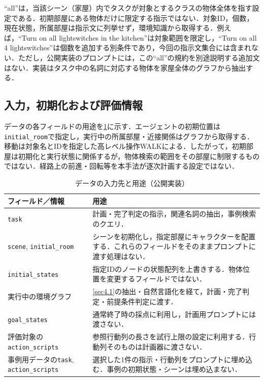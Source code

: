 ``all''は，当該シーン（家屋）内でタスクが対象とするクラスの物体全体を指す設定である．初期部屋にある物体だけに限定する指示ではない．対象ID，個数，現在状態，所属部屋は指示文に列挙せず，環境知識から取得する．例えば，``Turn on all lightswitches in the kitchen''は対象範囲を限定し，``Turn on all 4 lightswitches''は個数を追加する別条件であり，今回の指示文集合には含まれない．ただし，公開実装のプロンプトには，この``all''の規約を別途説明する追加文はない．実装はタスク中の名詞に対応する物体を家屋全体のグラフから抽出する．

\subsection{入力，初期化および評価情報}\label{sec3.inputs}
データの各フィールドの用途を\ref{tab:input_roles}に示す．エージェントの初期位置は\texttt{initial\_room}で指定し，実行中の所属部屋・近接関係はグラフから取得する．移動は対象名とIDを指定した高レベル操作WALKによる．したがって，初期部屋は初期化と実行状態に関係するが，物体検索の範囲をその部屋に制限するものではない．経路上の前進・回転等を本手法が逐次計画する設定ではない．

\begin{table}[tb]
\caption{データの入力先と用途（公開実装）}\label{tab:input_roles}
\centering\small
\begin{tabular}{p{}p{}}
\hline
フィールド／情報 & 用途 \\
\hline
\texttt{task} & 計画・完了判定の指示，関連名詞の抽出，事例検索のクエリ．\\
\texttt{scene}, \texttt{initial\_room} & シーンを初期化し，指定部屋にキャラクターを配置する．これらのフィールドをそのままプロンプトに渡す処理はない．\\
\texttt{initial\_states} & 指定IDのノードの状態配列を上書きする．物体位置を変更するフィールドではない．\\
実行中の環境グラフ & \ref{sec4.1}の抽出・自然言語化を経て，計画・完了判定・前提条件判定に渡す．\\
\texttt{goal\_states} & 通常終了時の採点に利用し，計画用プロンプトには渡さない．\\
評価対象の\texttt{action\_scripts} & 参照行動列の長さを試行上限の設定に利用する．行動列そのものは計画器に渡さない．\\
事例用データの\texttt{task}, \texttt{action\_scripts} & 選択した1件の指示・行動列をプロンプトに埋め込む．事例の初期状態・シーンは埋め込まない．\\
\hline
\end{tabular}
\end{table}

